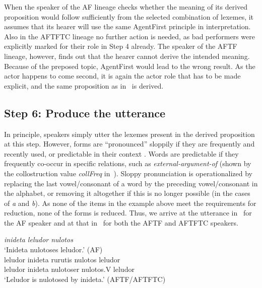 \documentclass[output=paper]{LSP/langsci}
\begin{document}
When the speaker of the AF lineage checks whether the meaning of its derived proposition would follow sufficiently from the selected combination of lexemes, it assumes that its hearer will use the same AgentFirst principle in interpretation. Also in the AFTFTC lineage no further action is needed, as bad performers were explicitly marked for their role in Step 4 already. The speaker of the AFTF lineage, however, finds out that the hearer cannot derive the intended meaning. Because of the preposed  topic, AgentFirst would lead to the wrong result. As the actor happens to come second, it is again the actor role that has to be made explicit, and the same proposition as in~ is derived. 

\subsection{Step 6: Produce the utterance}\label{17-le-sec:Produce-Utterance}
In principle, speakers simply utter the lexemes present in the derived proposition at this step. However, forms are ``pronounced'' sloppily if they are frequently and recently used, or predictable in their context \citep{Jurafskyetal2001Probabilistic}. Words are predictable if they frequently co-occur in specific relations, such as \textit{external-argument-of} (shown by the collostruction value \textit{collFreq} in~). Sloppy pronunciation is operationalized by replacing the last vowel/consonant of a word by the preceding vowel/consonant in the alphabet, or removing it altogether if this is no longer possible (in the cases of \textit{a} and \textit{b}). As none of the items in the example above meet the requirements for reduction, none of the forms is reduced. Thus, we arrive at the utterance in~ for the AF speaker and at that in~ for both the AFTF and AFTFTC speakers.

\ea\label{17-le-ex:8}
\begin{xlist}
\ex\label{17-le-ex:8a}
\emph{inideta leludor nulotos}\\
`Inideta nulotoses leludor.' (AF)\\

\ex\label{17-le-ex:8b}
\gll leludor inideta rurutis nulotos leludor\\
leludor inideta nulotoser nulotos.V leludor\\
\glt `Leludor is nulotosed by inideta.' (AFTF/AFTFTC)\\
\end{xlist}
\z
\end{document}
